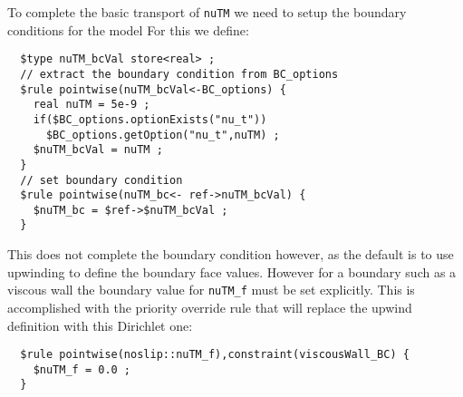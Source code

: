 \documentclass[letterpaper,twoside]{article}
\begin{document}
To complete the basic transport of {\tt nuTM} we need to setup the
boundary conditions for the model  For this we define:
\begin{verbatim}
  $type nuTM_bcVal store<real> ;
  // extract the boundary condition from BC_options
  $rule pointwise(nuTM_bcVal<-BC_options) {
    real nuTM = 5e-9 ;
    if($BC_options.optionExists("nu_t")) 
      $BC_options.getOption("nu_t",nuTM) ;
    $nuTM_bcVal = nuTM ;
  }
  // set boundary condition
  $rule pointwise(nuTM_bc<- ref->nuTM_bcVal) {
    $nuTM_bc = $ref->$nuTM_bcVal ;
  }
\end{verbatim}

This does not complete the boundary condition however, as the default
is to use upwinding to define the boundary face values.  However for a
boundary such as a viscous wall the boundary value for {\tt nuTM\_f}
must be set explicitly.  This is accomplished with the priority
override rule that will replace the upwind definition with this
Dirichlet one:
\begin{verbatim}
  $rule pointwise(noslip::nuTM_f),constraint(viscousWall_BC) {
    $nuTM_f = 0.0 ;
  }
\end{verbatim}
\end{document}
